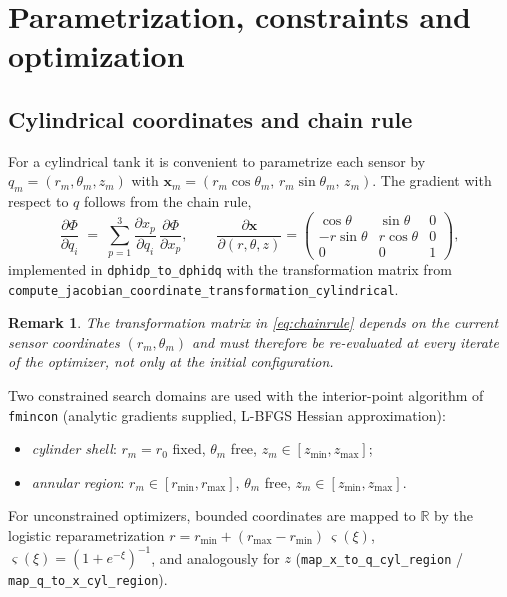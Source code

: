 \documentclass[11pt,a4paper]{article}
\newtheorem{remark}{Remark}
\newcommand{\R}{\mathbb{R}}
\newcommand{\code}[1]{\texttt{#1}}
\begin{document}
\section{Parametrization, constraints and optimization}

\subsection{Cylindrical coordinates and chain rule}

For a cylindrical tank it is convenient to parametrize each sensor by
$q_m = (r_m, \theta_m, z_m)$ with
$\bm{x}_m = (r_m \cos\theta_m,\, r_m \sin\theta_m,\, z_m)$. The gradient with respect to $q$
follows from the chain rule,
\begin{equation}
\label{eq:chainrule}
  \frac{\partial \Phi}{\partial q_i}
  \;=\;
  \sum_{p=1}^{3} \frac{\partial x_p}{\partial q_i}\, \frac{\partial \Phi}{\partial x_p},
  \qquad
  \frac{\partial \bm{x}}{\partial (r,\theta,z)}
  =
  \begin{pmatrix}
    \cos\theta & \sin\theta & 0 \\
    -r\sin\theta & r\cos\theta & 0 \\
    0 & 0 & 1
  \end{pmatrix},
\end{equation}
implemented in \code{dphidp\_to\_dphidq} with the transformation matrix from
\code{compute\_jacobian\_coordinate\_transformation\_cylindrical}.

\begin{remark}
The transformation matrix in \eqref{eq:chainrule} depends on the \emph{current} sensor
coordinates $(r_m, \theta_m)$ and must therefore be re-evaluated at every iterate of the
optimizer, not only at the initial configuration.
\end{remark}

Two constrained search domains are used with the interior-point algorithm of \code{fmincon}
(analytic gradients supplied, L-BFGS Hessian approximation):
\begin{itemize}
  \item \emph{cylinder shell}: $r_m = r_0$ fixed, $\theta_m$ free, $z_m \in [z_{\min}, z_{\max}]$;
  \item \emph{annular region}: $r_m \in [r_{\min}, r_{\max}]$, $\theta_m$ free,
        $z_m \in [z_{\min}, z_{\max}]$.
\end{itemize}
For unconstrained optimizers, bounded coordinates are mapped to $\R$ by the logistic
reparametrization $r = r_{\min} + (r_{\max}-r_{\min})\,\varsigma(\xi)$,
$\varsigma(\xi) = (1+e^{-\xi})^{-1}$, and analogously for $z$
(\code{map\_x\_to\_q\_cyl\_region} / \code{map\_q\_to\_x\_cyl\_region}).
\end{document}
